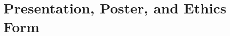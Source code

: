 \documentclass[12pt]{article}
\begin{document}
\section{Presentation, Poster, and Ethics Form}



\end{document}
